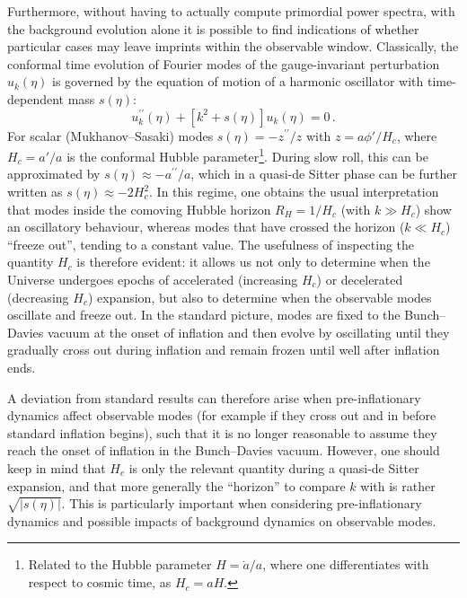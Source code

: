 \documentclass[aps,prd,11pt,showkeys,nofootinbib]{revtex4-2}
\begin{document}
Furthermore, without having to actually compute primordial power spectra, with the background evolution alone it is possible to find indications of whether particular cases may leave imprints within the observable window. Classically, the conformal time evolution of Fourier modes of the gauge-invariant perturbation $u_k(\eta)$ is governed by the equation of motion of a harmonic oscillator with time-dependent mass $s(\eta)$:
\begin{equation}
    u^{\prime\prime}_k(\eta) + \left[k^2+s(\eta)\right] u_k(\eta) = 0\,.
\end{equation}
For scalar (Mukhanov--Sasaki) modes $s(\eta) = -z^{\prime\prime}/z$ with $z = a \phi'/H_c$, where $H_c=a'/a$ is the conformal Hubble parameter\footnote{Related to the Hubble parameter $H=\dot{a}/a$, where one differentiates with respect to cosmic time, as $H_c=aH$.}. During slow roll, this can be approximated by $s(\eta) \approx -a^{\prime\prime}/a$, which in a quasi-de Sitter phase can be further written as $s(\eta) \approx - 2 H_c^2$. In this regime, one obtains the usual interpretation that modes inside the comoving Hubble horizon $R_H = 1/H_c$ (with $k \gg H_c$) show an oscillatory behaviour, whereas modes that have crossed the horizon ($k \ll H_c$) ``freeze out'', tending to a constant value. The usefulness of inspecting the quantity $H_c$ is therefore evident: it allows us not only to determine when the Universe undergoes epochs of accelerated (increasing $H_c$) or decelerated (decreasing $H_c$) expansion, but also to determine when the observable modes oscillate and freeze out. In the standard picture, modes are fixed to the Bunch--Davies vacuum at the onset of inflation and then evolve by oscillating until they gradually cross out during inflation and remain frozen until well after inflation ends.

A deviation from standard results can therefore arise when pre-inflationary dynamics affect observable modes (for example if they cross out and in before standard inflation begins), such that it is no longer reasonable to assume they reach the onset of inflation in the Bunch--Davies vacuum. However, one should keep in mind that $H_c$ is only the relevant quantity during a quasi-de Sitter expansion, and that more generally the ``horizon'' to compare $k$ with is rather $\sqrt{|s(\eta)|}$. This is particularly important when considering pre-inflationary dynamics and possible impacts of background dynamics on observable modes.
\end{document}
